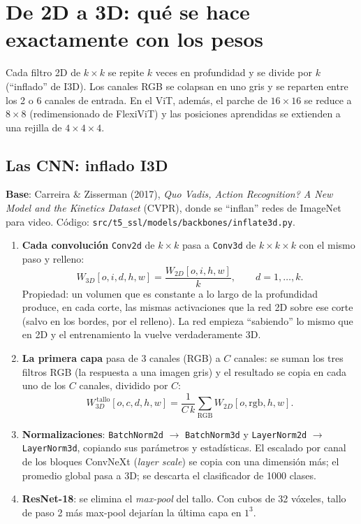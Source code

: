 \documentclass[11pt,a4paper]{article}
\begin{document}
\section{De 2D a 3D: qué se hace exactamente con los pesos}
\label{sec:inflate}

\begin{tldrbox}
Cada filtro 2D de $k\times k$ se repite $k$ veces en profundidad y se divide por $k$ (``inflado''
de I3D). Los canales RGB se colapsan en uno gris y se reparten entre los 2 o 6 canales de entrada.
En el ViT, además, el parche de $16\times16$ se reduce a $8\times8$ (redimensionado de FlexiViT) y
las posiciones aprendidas se extienden a una rejilla de $4\times4\times4$.
\end{tldrbox}

\subsection{Las CNN: inflado I3D}

\textbf{Base}: Carreira \& Zisserman (2017), \emph{Quo Vadis, Action Recognition? A New Model and the
Kinetics Dataset} (CVPR), donde se ``inflan'' redes de ImageNet para video. Código:
\texttt{src/t5\_ssl/models/backbones/inflate3d.py}.

\begin{enumerate}
\item \textbf{Cada convolución} \texttt{Conv2d} de $k\times k$ pasa a \texttt{Conv3d} de
  $k\times k\times k$ con el mismo paso y relleno:
  \[ W_{3D}[o,i,d,h,w] = \frac{W_{2D}[o,i,h,w]}{k}, \qquad d = 1,\ldots,k. \]
  Propiedad: un volumen que es constante a lo largo de la profundidad produce, en cada corte, las
  mismas activaciones que la red 2D sobre ese corte (salvo en los bordes, por el relleno). La red
  empieza ``sabiendo'' lo mismo que en 2D y el entrenamiento la vuelve verdaderamente 3D.
\item \textbf{La primera capa} pasa de 3 canales (RGB) a $C$ canales: se suman los tres filtros
  RGB (la respuesta a una imagen gris) y el resultado se copia en cada uno de los $C$ canales,
  dividido por $C$:
  \[ W_{3D}^{\,\text{tallo}}[o,c,d,h,w] = \frac{1}{C\,k}\sum_{\text{RGB}} W_{2D}[o,\text{rgb},h,w]. \]
\item \textbf{Normalizaciones}: \texttt{BatchNorm2d} $\rightarrow$ \texttt{BatchNorm3d} y
  \texttt{LayerNorm2d} $\rightarrow$ \texttt{LayerNorm3d}, copiando sus parámetros y estadísticas.
  El escalado por canal de los bloques ConvNeXt (\emph{layer scale}) se copia con una dimensión
  más; el promedio global pasa a 3D; se descarta el clasificador de 1000 clases.
\item \textbf{ResNet-18}: se elimina el \emph{max-pool} del tallo. Con cubos de 32 vóxeles, tallo de
  paso 2 más max-pool dejarían la última capa en $1^3$.
\end{enumerate}
\end{document}

